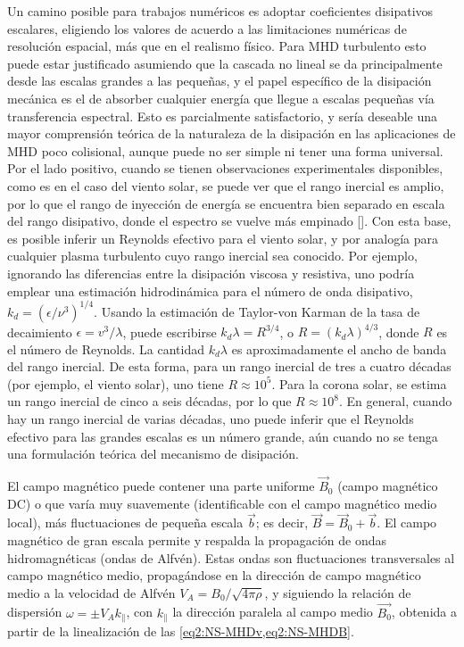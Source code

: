 Un camino posible para trabajos numéricos es adoptar coeficientes
disipativos escalares, eligiendo los valores de acuerdo a las
limitaciones numéricas de resolución espacial, más que en el realismo
físico. Para MHD turbulento esto puede estar justificado asumiendo que
la cascada no lineal se da principalmente desde las escalas grandes a
las pequeñas, y el papel específico de la disipación mecánica es el de
absorber cualquier energía que llegue a escalas pequeñas vía
transferencia espectral. Esto es parcialmente satisfactorio, y sería
deseable una mayor comprensión teórica de la naturaleza de la
disipación en las aplicaciones de MHD poco colisional, aunque puede no
ser simple ni tener una forma universal. Por el lado positivo, cuando
se tienen observaciones experimentales disponibles, como es en el caso
del viento solar, se puede ver que el rango inercial es amplio, por lo
que el rango de inyección de energía se encuentra bien separado en
escala del rango disipativo, donde el espectro se vuelve más empinado
[\cite{leamon_observational_1998}]. Con esta base, es posible inferir
un Reynolds efectivo para el viento solar, y por analogía para
cualquier plasma turbulento cuyo rango inercial sea conocido. Por
ejemplo, ignorando las diferencias entre la disipación viscosa y
resistiva, uno podría emplear una estimación hidrodinámica para el
número de onda disipativo, $k_d
= \left(\epsilon/\nu^3\right)^{1/4}$. Usando la estimación de
Taylor-von Karman de la tasa de decaimiento $\epsilon = v^3/\lambda$,
puede escribirse $k_d \lambda = R^{3/4}$, o $R =
\left(k_d \lambda\right)^{4/3}$, donde $R$ es el número de
Reynolds. La cantidad $k_d \lambda$ es aproximadamente el ancho de
banda del rango inercial. De esta forma, para un rango inercial de
tres a cuatro décadas (por ejemplo, el viento solar), uno tiene $R
\approx 10^5$. Para la corona solar, se estima un rango inercial de
cinco a seis décadas, por lo que $R \approx 10^8$. En general, cuando
hay un rango inercial de varias décadas, uno puede inferir que el
Reynolds efectivo para las grandes escalas es un número grande, aún
cuando no se tenga una formulación teórica del mecanismo de
disipación.

El campo magnético puede contener una parte uniforme $\vec{B}_0$
(campo magnético DC) o que varía muy suavemente (identificable con el
campo magnético medio local), más fluctuaciones de pequeña escala
$\vec{b}$; es decir, $\vec{B} = \vec{B}_0 + \vec{b}$. El campo
magnético de gran escala permite y respalda la propagación de ondas
hidromagnéticas (ondas de Alfv\'en). Estas ondas son fluctuaciones
transversales al campo magnético medio, propagándose en la dirección
de campo magnético medio a la velocidad de Alfv\'en $V_A =
B_0/\sqrt{4\pi\rho}$, y siguiendo la relación de dispersión $\omega
= \pm V_A k_\parallel$, con $k_\parallel$ la dirección paralela al
campo medio $\vec{B_0}$, obtenida a partir de la linealización de
las \cref{eq2:NS-MHDv,eq2:NS-MHDB}.


